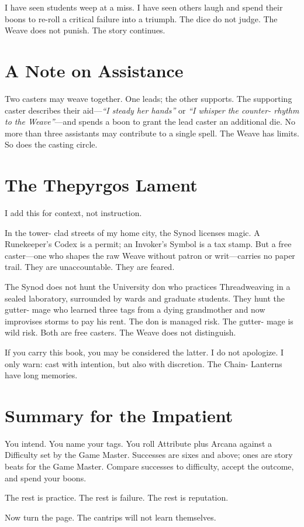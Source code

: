 I have seen students weep at a miss. I have seen others laugh and spend their boons to re-roll a critical failure into a triumph. The dice do not judge. The Weave does not punish. The story continues.

\section{A Note on Assistance}

Two casters may weave together. One leads; the other supports. The supporting caster describes their aid---\emph{``I steady her hands''} or \emph{``I whisper the counter- rhythm to the Weave''}---and spends a boon to grant the lead caster an additional die. No more than three assistants may contribute to a single spell. The Weave has limits. So does the casting circle.

\section{The Thepyrgos Lament}

I add this for context, not instruction.

In the tower- clad streets of my home city, the Synod licenses magic. A Runekeeper's Codex is a permit; an Invoker's Symbol is a tax stamp. But a free caster---one who shapes the raw Weave without patron or writ---carries no paper trail. They are unaccountable. They are feared.

The Synod does not hunt the University don who practices Threadweaving in a sealed laboratory, surrounded by wards and graduate students. They hunt the gutter- mage who learned three tags from a dying grandmother and now improvises storms to pay his rent. The don is managed risk. The gutter- mage is wild risk. Both are free casters. The Weave does not distinguish.

If you carry this book, you may be considered the latter. I do not apologize. I only warn: cast with intention, but also with discretion. The Chain- Lanterns have long memories.

\section{Summary for the Impatient}

You intend. You name your tags. You roll Attribute plus Arcana against a Difficulty set by the Game Master. Successes are sixes and above; ones are story beats for the Game Master. Compare successes to difficulty, accept the outcome, and spend your boons.

The rest is practice. The rest is failure. The rest is reputation.

Now turn the page. The cantrips will not learn themselves.
